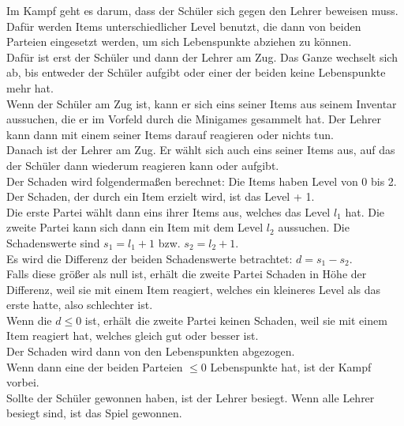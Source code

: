 Im Kampf geht es darum, dass der Schüler sich gegen den Lehrer beweisen muss. Dafür werden Items unterschiedlicher Level benutzt, die dann von beiden Parteien eingesetzt werden, um sich Lebenspunkte abziehen zu können.\\
Dafür ist erst der Schüler und dann der Lehrer am Zug. Das Ganze wechselt sich ab, bis entweder der Schüler aufgibt oder einer der beiden keine Lebenspunkte mehr hat.\\
Wenn der Schüler am Zug ist, kann er sich eins seiner Items aus seinem Inventar aussuchen, die er im Vorfeld durch die Minigames gesammelt hat. Der Lehrer kann dann mit einem seiner Items darauf reagieren oder nichts tun.\\
Danach ist der Lehrer am Zug. Er wählt sich auch eins seiner Items aus, auf das der Schüler dann wiederum reagieren kann oder aufgibt.\\
Der Schaden wird folgendermaßen berechnet: Die Items haben Level von 0 bis 2. Der Schaden, der durch ein Item erzielt wird, ist das Level + 1.\\
Die erste Partei wählt dann eins ihrer Items aus, welches das Level $l_1$ hat. Die zweite Partei kann sich dann ein Item mit dem Level $l_2$ aussuchen. Die Schadenswerte sind $s_1 = l_1 + 1$ bzw. $s_2 = l_2 + 1$.\\
Es wird die Differenz der beiden Schadenswerte betrachtet: $d = s_1 - s_2$.\\
Falls diese größer als null ist, erhält die zweite Partei Schaden in Höhe der Differenz, weil sie mit einem Item reagiert, welches ein kleineres Level als das erste hatte, also schlechter ist.\\
Wenn die $d\leq 0$ ist, erhält die zweite Partei keinen Schaden, weil sie mit einem Item reagiert hat, welches gleich gut oder besser ist.\\
Der Schaden wird dann von den Lebenspunkten abgezogen.\\
Wenn dann eine der beiden Parteien $\leq 0$ Lebenspunkte hat, ist der Kampf vorbei.\\
Sollte der Schüler gewonnen haben, ist der Lehrer besiegt. Wenn alle Lehrer besiegt sind, ist das Spiel gewonnen.\\
